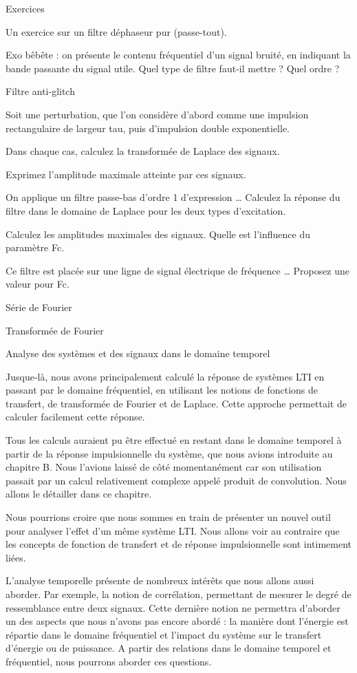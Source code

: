 \documentclass[]{article}
\begin{document}
Exercices~

Un exercice sur un filtre déphaseur pur (passe-tout).~

Exo bêbête : on présente le contenu fréquentiel d'un signal bruité, en
indiquant la bande passante du signal utile. Quel type de filtre faut-il
mettre ? Quel ordre ?

Filtre anti-glitch

Soit une perturbation, que l'on considère d'abord comme une impulsion
rectangulaire de largeur tau, puis d'impulsion double exponentielle.

Dans chaque cas, calculez la transformée de Laplace des signaux.

Exprimez l'amplitude maximale atteinte par ces signaux.

On applique un filtre passe-bas d'ordre 1 d'expression \ldots{} Calculez
la réponse du filtre dans le domaine de Laplace pour les deux types
d'excitation.

Calculez les amplitudes maximales des signaux. Quelle est l'influence du
paramètre Fc.

Ce filtre est placée sur une ligne de signal électrique de fréquence
\ldots{} Proposez une valeur pour Fc.

Série de Fourier

Transformée de Fourier

Analyse des systèmes et des signaux dans le domaine temporel

Jusque-là, nous avons principalement calculé la réponse de systèmes LTI
en passant par le domaine fréquentiel, en utilisant les notions de
fonctions de transfert, de transformée de Fourier et de Laplace. Cette
approche permettait de calculer facilement cette réponse.

Tous les calculs auraient pu être effectué en restant dans le domaine
temporel à partir de la réponse impulsionnelle du système, que nous
avions introduite au chapitre B. Nous l'avions laissé de côté
momentanément car son utilisation passait par un calcul relativement
complexe appelé produit de convolution. Nous allons le détailler dans ce
chapitre.

Nous pourrions croire que nous sommes en train de présenter un nouvel
outil pour analyser l'effet d'un même système LTI. Nous allons voir au
contraire que les concepts de fonction de transfert et de réponse
impulsionnelle sont intimement liées.

L'analyse temporelle présente de nombreux intérêts que nous allons aussi
aborder. Par exemple, la notion de corrélation, permettant de mesurer le
degré de ressemblance entre deux signaux. Cette dernière notion ne
permettra d'aborder un des aspects que nous n'avons pas encore abordé :
la manière dont l'énergie est répartie dans le domaine fréquentiel et
l'impact du système sur le transfert d'énergie ou de puissance. A partir
des relations dans le domaine temporel et fréquentiel, nous pourrons
aborder ces questions.
\end{document}
